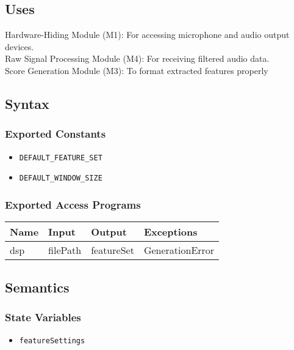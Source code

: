 \documentclass[12pt, titlepage]{article}
\begin{document}
\subsection{Uses}
Hardware-Hiding Module (M1): For accessing microphone and audio output devices. \\
Raw Signal Processing Module (M4): For receiving filtered audio data. \\
Score Generation Module (M3): To format extracted features properly \\

\subsection{Syntax}  

\subsubsection{Exported Constants}  
\begin{itemize}
    \item \texttt{DEFAULT\_FEATURE\_SET}  
    \item \texttt{DEFAULT\_WINDOW\_SIZE}  
\end{itemize}  

\subsubsection{Exported Access Programs}  
\begin{center}  
\begin{tabular}{|p{4.5cm}|p{4cm}|p{2.5cm}|p{3.5cm}|}  
\hline  
\textbf{Name} & \textbf{Input} & \textbf{Output} & \textbf{Exceptions} \\  
\hline    
dsp & filePath & featureSet & GenerationError \\
\hline  
\end{tabular}  
\end{center}  

\subsection{Semantics}  

\subsubsection{State Variables}  
\begin{itemize}  
    \item \texttt{featureSettings}  
\end{itemize}  
\end{document}
